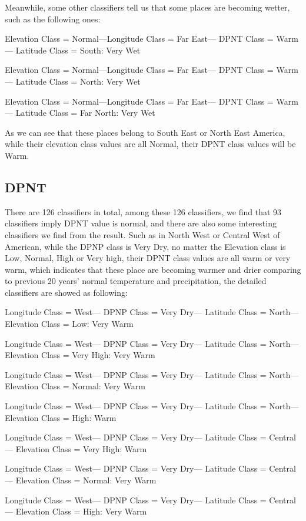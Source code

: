 \documentclass[11pt]{article}
\begin{document}
Meanwhile, some other classifiers tell us that some places are becoming wetter, such as the following ones:

Elevation Class = Normal---Longitude Class = Far East--- DPNT Class = Warm--- Latitude Class = South:  Very Wet

Elevation Class = Normal---Longitude Class = Far East--- DPNT Class = Warm--- Latitude Class = North:  Very Wet

Elevation Class = Normal---Longitude Class = Far East--- DPNT Class = Warm--- Latitude Class = Far North:  Very Wet

As we can see that these places belong to South East or North East America, while their elevation class values are all Normal, their DPNT class values will be Warm.

\subsection{DPNT}

There are 126 classifiers in total, among these 126 classifiers, we find that 93 classifiers imply DPNT value is normal, and there are also some interesting classifiers we find from the result. Such as in North West or Central West of American, while the DPNP class is Very Dry, no matter the Elevation class is Low, Normal, High or Very high, their DPNT class values are all warm or very warm, which indicates that these place are becoming warmer and drier comparing to previous 20 years’ normal temperature and precipitation, the detailed classifiers are showed as following:

Longitude Class = West--- DPNP Class = Very Dry--- Latitude Class = North--- Elevation Class = Low:  Very Warm

Longitude Class = West--- DPNP Class = Very Dry--- Latitude Class = North--- Elevation Class = Very High:  Very Warm

Longitude Class = West--- DPNP Class = Very Dry--- Latitude Class = North--- Elevation Class = Normal:  Very Warm

Longitude Class = West--- DPNP Class = Very Dry--- Latitude Class = North--- Elevation Class = High:  Warm

Longitude Class = West--- DPNP Class = Very Dry--- Latitude Class = Central--- Elevation Class = Very High:  Warm

Longitude Class = West--- DPNP Class = Very Dry--- Latitude Class = Central--- Elevation Class = Normal:  Very Warm

Longitude Class = West--- DPNP Class = Very Dry--- Latitude Class = Central--- Elevation Class = High:  Very Warm
\end{document}
